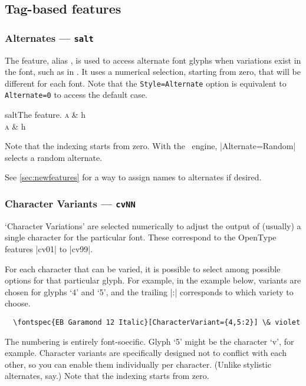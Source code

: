 \documentclass[a4paper]{l3doc}
\begin{document}
\subsection{Tag-based features}


\subsubsection{Alternates --- \texttt{salt}}

The  feature, alias , is used to access alternate font glyphs when variations exist in the font, such as in .
It uses a numerical selection, starting from zero, that will be different for each font.
Note that the \texttt{Style=Alternate} option is equivalent
to \texttt{Alternate=0} to access the default case.

\begin{Xexample}[firstline=2]{salt}{The  feature.}
  \huge
  \textsc{a} \& h \\
  \textsc{a} \& h
\end{Xexample}

Note that the indexing starts from zero.
With the \LuaTeX\ engine, |Alternate=Random| selects a random alternate.

See \vref{sec:newfeatures} for a way to assign names to alternates if desired.


\subsubsection{Character Variants --- \texttt{cvNN}}

`Character Variations' are selected
numerically to adjust the output of (usually) a single character for the
particular font. These correspond to the OpenType features |cv01| to |cv99|.

For each character that can be varied, it is possible to select among
possible options for that particular glyph.
For example, in the example below, variants are chosen for glyphs `4' and `5',
and the trailing |:| corresponds to which variety to choose.
\begin{Verbatim}
  \fontspec{EB Garamond 12 Italic}[CharacterVariant={4,5:2}] \& violet
\end{Verbatim}
The numbering is entirely font-soecific. Glyph `5' might be the character `v', for example.
Character variants are specifically designed not to conflict with each
other, so you can enable them individually per character.
(Unlike stylistic alternates, say.)
Note that the indexing starts from zero.
\end{document}
